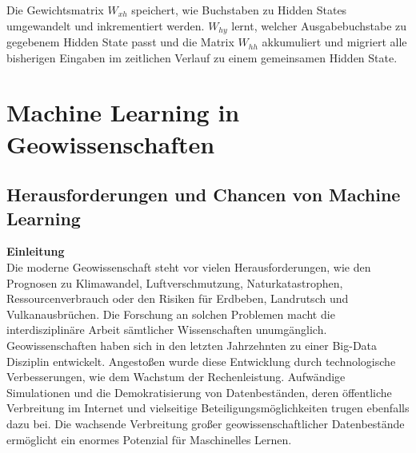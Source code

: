 \documentclass[11pt,ceqn]{book}
\begin{document}
Die Gewichtsmatrix $W_{xh}$ speichert, wie Buchstaben zu Hidden States umgewandelt und inkrementiert werden. $W_{hy}$ lernt, welcher Ausgabebuchstabe zu gegebenem Hidden State passt und die Matrix $W_{hh}$ akkumuliert und migriert alle bisherigen Eingaben im zeitlichen Verlauf zu einem gemeinsamen Hidden State.

\newpage
\section{Machine Learning in Geowissenschaften}

\subsection{Herausforderungen und Chancen von Machine Learning  }
\textbf{Einleitung}\\
Die moderne Geowissenschaft steht vor vielen Herausforderungen, wie den Prognosen zu Klimawandel, Luftverschmutzung, Naturkatastrophen, Ressourcenverbrauch oder den Risiken für Erdbeben, Landrutsch und Vulkanausbrüchen. Die Forschung an solchen Problemen macht die interdisziplinäre Arbeit sämtlicher Wissenschaften unumgänglich.
Geowissenschaften haben sich in den letzten Jahrzehnten  zu einer Big-Data Disziplin entwickelt. Angestoßen wurde diese Entwicklung durch technologische Verbesserungen, wie dem Wachstum der Rechenleistung. Aufwändige Simulationen und die Demokratisierung von Datenbeständen, deren öffentliche Verbreitung im Internet und vielseitige Beteiligungsmöglichkeiten trugen ebenfalls dazu bei. Die wachsende Verbreitung großer geowissenschaftlicher Datenbestände ermöglicht ein enormes Potenzial für Maschinelles Lernen\cite{machgeo}.\\

\bigskip
\end{document}
